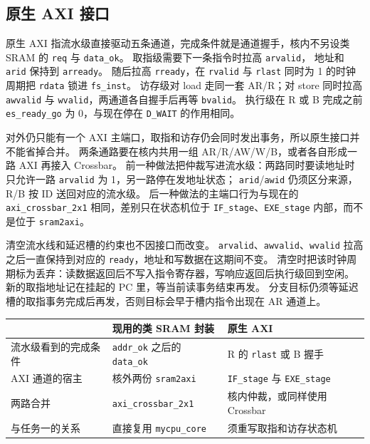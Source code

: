 \documentclass{article}
\begin{document}
\subsection{原生 AXI 接口}
原生 AXI 指流水级直接驱动五条通道，完成条件就是通道握手，核内不另设类 SRAM 的 \texttt{req} 与 \texttt{data\_ok}。
取指级需要下一条指令时拉高 \texttt{arvalid}，
地址和 \texttt{arid} 保持到 \texttt{arready}。
随后拉高 \texttt{rready}，在 \texttt{rvalid} 与 \texttt{rlast} 同时为 1 的时钟周期把 \texttt{rdata} 锁进 \texttt{fs\_inst}。
访存级对 load 走同一套 AR/R；对 store 同时拉高 \texttt{awvalid} 与 \texttt{wvalid}，两通道各自握手后再等 \texttt{bvalid}。
执行级在 R 或 B 完成之前 \texttt{es\_ready\_go} 为 0，与现在停在 \texttt{D\_WAIT} 的作用相同。

对外仍只能有一个 AXI 主端口，取指和访存仍会同时发出事务，所以原生接口并不能省掉合并。
两条通路要在核内共用一组 AR/R/AW/W/B，或者各自形成一路 AXI 再接入 Crossbar。
前一种做法把仲裁写进流水级：两路同时要读地址时只允许一路 \texttt{arvalid} 为 1，另一路停在发地址状态；
\texttt{arid}/\texttt{awid} 仍须区分来源，R/B 按 ID 送回对应的流水级。
后一种做法的主端口行为与现在的 \texttt{axi\_crossbar\_2x1} 相同，差别只在状态机位于 \texttt{IF\_stage}、\texttt{EXE\_stage} 内部，而不是位于 \texttt{sram2axi}。

清空流水线和延迟槽的约束也不因接口而改变。
\texttt{arvalid}、\texttt{awvalid}、\texttt{wvalid} 拉高之后一直保持到对应的 \texttt{ready}，地址和写数据在这期间不变。
清空时把该时钟周期标为丢弃：读数据返回后不写入指令寄存器，写响应返回后执行级回到空闲。
新的取指地址记在挂起的 PC 里，等当前读事务结束再发。
分支目标仍须等延迟槽的取指事务完成后再发，否则目标会早于槽内指令出现在 AR 通道上。

\begin{center}
\small
\begin{tabular}{@{}p{}p{}p{}@{}}
\toprule
 & 现用的类 SRAM 封装 & 原生 AXI \\
\midrule
流水级看到的完成条件 & \texttt{addr\_ok} 之后的 \texttt{data\_ok} & R 的 \texttt{rlast} 或 B 握手 \\
AXI 通道的宿主 & 核外两份 \texttt{sram2axi} & \texttt{IF\_stage} 与 \texttt{EXE\_stage} \\
两路合并 & \texttt{axi\_crossbar\_2x1} & 核内仲裁，或同样使用 Crossbar \\
与任务一的关系 & 直接复用 \texttt{mycpu\_core} & 须重写取指和访存状态机 \\
\bottomrule
\end{tabular}
\end{center}
\end{document}
